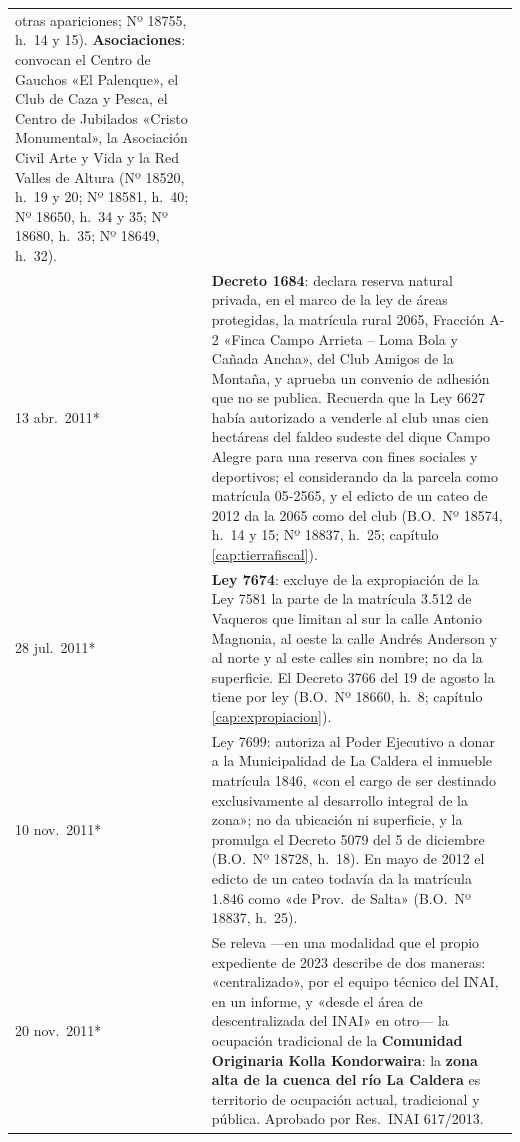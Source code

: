 \begin{longtable}{@{}p{2.7cm}p{10.3cm}@{}}
otras apariciones; Nº 18755, h.\ 14 y 15). \textbf{Asociaciones}: convocan el Centro de Gauchos «El Palenque», el Club de Caza y Pesca, el Centro de Jubilados «Cristo Monumental», la Asociación Civil Arte y Vida y la Red Valles de Altura (Nº 18520, h.\ 19 y 20; Nº 18581, h.\ 40; Nº 18650, h.\ 34 y 35; Nº 18680, h.\ 35; Nº 18649, h.\ 32). \\
13 abr.\ 2011* & \textbf{Decreto 1684}: declara reserva natural privada, en el marco de la ley de áreas protegidas, la matrícula rural 2065, Fracción A-2 «Finca Campo Arrieta -- Loma Bola y Cañada Ancha», del Club Amigos de la Montaña, y aprueba un convenio de adhesión que no se publica. Recuerda que la Ley 6627 había autorizado a venderle al club unas cien hectáreas del faldeo sudeste del dique Campo Alegre para una reserva con fines sociales y deportivos; el considerando da la parcela como matrícula 05-2565, y el edicto de un cateo de 2012 da la 2065 como del club (B.O.\ Nº 18574, h.\ 14 y 15; Nº 18837, h.\ 25; capítulo \ref{cap:tierrafiscal}). \\
28 jul.\ 2011* & \textbf{Ley 7674}: excluye de la expropiación de la Ley 7581 la parte de la matrícula 3.512 de Vaqueros que limitan al sur la calle Antonio Magnonia, al oeste la calle Andrés Anderson y al norte y al este calles sin nombre; no da la superficie. El Decreto 3766 del 19 de agosto la tiene por ley (B.O.\ Nº 18660, h.\ 8; capítulo \ref{cap:expropiacion}). \\
10 nov.\ 2011* & Ley 7699: autoriza al Poder Ejecutivo a donar a la Municipalidad de La Caldera el inmueble matrícula 1846, «con el cargo de ser destinado exclusivamente al desarrollo integral de la zona»; no da ubicación ni superficie, y la promulga el Decreto 5079 del 5 de diciembre (B.O.\ Nº 18728, h.\ 18). En mayo de 2012 el edicto de un cateo todavía da la matrícula 1.846 como «de Prov.\ de Salta» (B.O.\ Nº 18837, h.\ 25). \\
20 nov.\ 2011* & Se releva ---en una modalidad que el propio expediente de 2023 describe de dos maneras: «centralizado», por el equipo técnico del INAI, en un informe, y «desde el área de descentralizada del INAI» en otro--- la ocupación tradicional de la \textbf{Comunidad Originaria Kolla Kondorwaira}: la \textbf{zona alta de la cuenca del río La Caldera} es territorio de ocupación actual, tradicional y pública. Aprobado por Res.\ INAI 617/2013. \\

\end{longtable}
